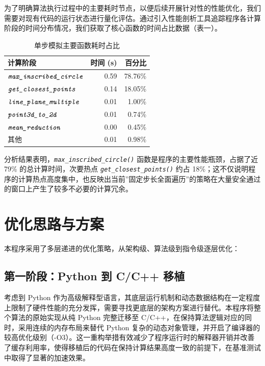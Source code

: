 \documentclass[12pt]{article}
\newcommand{\func}[1]{\textit{\texttt{#1}}}
\begin{document}
为了明确算法执行过程中的主要耗时节点，以便后续开展针对性的性能优化，我们需要对现有代码的运行状态进行量化评估。通过引入性能剖析工具追踪程序各计算阶段的时间分布情况，我们获取了核心函数的时间占比数据（表一）。

\begin{table}[H]
  \centering
  \caption{单步模拟主要函数耗时占比}
  \vspace{3mm}
  \begin{tabular}{lrr}
    \toprule
    \textbf{计算阶段} & \textbf{时间 (s)} & \textbf{百分比} \\
    \midrule
    $\func{max\_inscribed\_circle}$ & 0.59 & 78.76\% \\
    $\func{get\_closest\_points}$ & 0.14 & 18.05\% \\
    $\func{line\_plane\_multiple}$ & 0.01 & 1.00\% \\
    $\func{point3d\_to\_2d}$ & 0.01 & 0.74\% \\
    $\func{mean\_reduction}$ & 0.00 & 0.45\% \\
    其他 & 0.01 & 0.98\% \\
    \bottomrule
  \end{tabular}
\end{table}

分析结果表明，\func{max\_inscribed\_circle()} 函数是程序的主要性能瓶颈，占据了近 79\% 的总计算时间，次要热点 \func{get\_closest\_points()} 约占 18\%；这不仅说明程序的计算热点高度集中，也反映出当前”固定步长全面遍历”的策略在大量安全通过的窗口上产生了较多不必要的计算冗余。

\section{优化思路与方案}

本程序采用了多层递进的优化策略，从架构级、算法级到指令级逐层优化：

\subsection{第一阶段：Python 到 C/C++ 移植}

考虑到 Python 作为高级解释型语言，其底层运行机制和动态数据结构在一定程度上限制了硬件性能的充分发挥，需要寻找更底层的架构方案进行替代。本程序将整个算法的原始实现从纯 Python 完整迁移至 C/C++，在保持算法逻辑对应的同时，采用连续的内存布局来替代 Python 复杂的动态对象管理，并开启了编译器的较高优化级别（-O3）。这一重构举措有效减少了程序运行时的解释器开销并改善了缓存利用率，使得移植后的代码在保持计算结果高度一致的前提下，在基准测试中取得了显著的加速效果。
\end{document}
